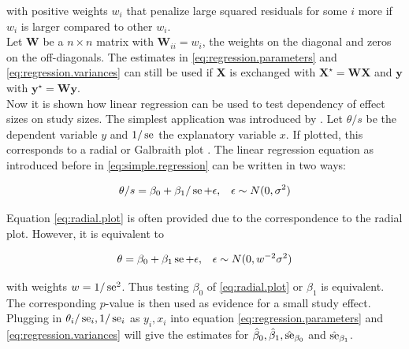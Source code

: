 \documentclass[11pt,a4paper,twoside]{book}\usepackage[]{graphicx}\usepackage[]{color}
\begin{document}
with positive weights $w_i$ that penalize large squared residuals for some $i$ more if $w_i$ is larger compared to other $w_i$. \\
Let $\mathbf{W}$ be a $n \times n$ matrix with $\mathbf{W}_{ii} = w_i$, the weights on the diagonal and zeros on the off-diagonals. The estimates in \eqref{eq:regression.parameters} and \eqref{eq:regression.variances} can still be used if $\mathbf{X}$ is exchanged with $\mathbf{X}^\star =  \mathbf{W} \mathbf{X}$ and $\mathbf{y}$ with $\mathbf{y}^\star = \mathbf{W} \mathbf{y}$. \label{weighted.regression} \\
Now it is shown how linear regression can be used to test dependency of effect sizes on study sizes. The simplest application was introduced by \citet{Egger}.
Let $\theta/s$ be the dependent variable $y$ and $1/\operatorname{se}$ the explanatory variable $x$. If plotted, this corresponds to a radial or Galbraith plot \citep{galbraith}. The linear regression equation as introduced before in \eqref{eq:simple.regression} can be written in two ways:

\begin{align}
\theta/s &= \beta_0 + \beta_1/\operatorname{se} + \epsilon, & \epsilon \sim N(0, \sigma^2) \label{eq:radial.plot} 
\end{align}

Equation \eqref{eq:radial.plot} is often provided due to the correspondence to the radial plot. However, it is equivalent to

\begin{align}
\theta &= \beta_0 + \beta_1 \operatorname{se} + \epsilon, & \epsilon \sim N(0, w^{-2}\sigma^2) \label{eq:egger.plot}
\end{align}

with weights $w = 1/\operatorname{se}^2$. Thus testing $\beta_0$ of \eqref{eq:radial.plot} or $\beta_1$ is equivalent. The corresponding $p$-value is then used as evidence for a small study effect. Plugging in  $\theta_i/\operatorname{se}_i, 1/\operatorname{se}_i$ as $y_i, x_i$ into equation \eqref{eq:regression.parameters} and \eqref{eq:regression.variances} will give the estimates for $\hat{\beta}_0, \hat{\beta}_1,\hat{\operatorname{se}}_{\beta_0}$ and $\hat{\operatorname{se}}_{\beta_1}$.

\end{document}
